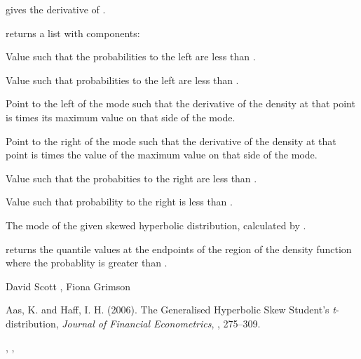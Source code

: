 \begin{Value}
 gives the derivative of .

 returns a list with components:
\begin{ldescription}
\item[\code{xTiny}] Value such that the probabilities to the left are less
than .
\item[\code{xSmall}] Value such that probabilities to the left are less
than .
\item[\code{lowBreak}] Point to the left of the mode such that the
derivative of the density at that point is  times its
maximum value on that side of the mode.
\item[\code{highBreak}] Point to the right of the mode such that the derivative
of the density at that point is  times the value of the
maximum value on that side of the mode.
\item[\code{xLarge}] Value such that the probabities to the right are less than
.
\item[\code{xHuge}] Value such that probability to the right is less than
.
\item[\code{modeDist}] The mode of the given skewed hyperbolic distribution,
calculated by .
\end{ldescription}


 returns the quantile values at the
endpoints of the region of the density function where the probablity
is greater than .
\end{Value}
\begin{Author}\relax
David Scott , Fiona Grimson
\end{Author}
\begin{References}\relax
Aas, K. and Haff, I. H. (2006).
The Generalised Hyperbolic Skew Student's \emph{t}-distribution,
\emph{Journal of Financial Econometrics}, , 275--309.
\end{References}
\begin{SeeAlso}\relax
{}, , 
\end{SeeAlso}
